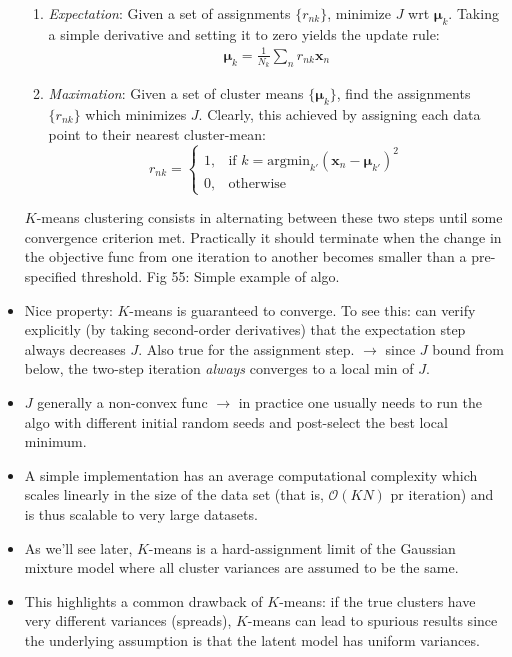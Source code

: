 \documentclass[norsk,a4paper,11pt]{article}
\begin{document}
\begin{itemize}
	\begin{enumerate}
		\item \textit{Expectation}: Given a set of assignments $\{ r_{nk} \}$, minimize $J$ wrt $\bm{\mu}_k$. Taking a simple derivative and setting it to zero yields the update rule:
		\begin{align}
			\bm{\mu}_k = \frac{1}{N_k} \sum_n r_{nk} \bm{x}_n
		\end{align}
		\item \textit{Maximation}: Given a set of cluster means $\{ \bm{\mu}_k \}$, find the assignments $\{ r_{nk} \}$ which minimizes $J$. Clearly, this achieved by assigning each data point to their nearest cluster-mean:
		\[ r_{nk} = \begin{cases}
				 1, & \text{if } k = \text{argmin}_{k'} (\bm{x}_n - \bm{\mu}_{k'})^2 \\
				 0, & \text{otherwise}  
		\end{cases} \]
	\end{enumerate}  
	$K$-means clustering consists in alternating between these two steps until some convergence criterion met. Practically it should terminate when the change in the objective func from one iteration to another becomes smaller than a pre-specified threshold. Fig 55: Simple example of algo.
	\item Nice property: $K$-means is guaranteed to converge. To see this: can verify explicitly (by taking second-order derivatives) that the expectation step always decreases $J$. Also true for the assignment step. $\rightarrow$ since $J$ bound from below, the two-step iteration \textit{always} converges to a local min of $J$. 
	\item $J$ generally a non-convex func $\rightarrow$ in practice one usually needs to run the algo with different initial random seeds and post-select the best local minimum. 
	\item A simple implementation has an average computational complexity which scales linearly in the size of the data set (that is, $\mathcal{O}(KN)$ pr iteration) and is thus scalable to very large datasets.
	\item As we'll see later, $K$-means is a hard-assignment limit of the Gaussian mixture model where all cluster variances are assumed to be the same. 
	\item This highlights a common drawback of $K$-means: if the true clusters have very different variances (spreads), $K$-means can lead to spurious results since the underlying assumption is that the latent model has uniform variances.
\end{itemize}
\end{document}
